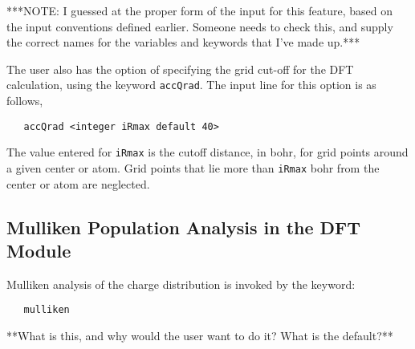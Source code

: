 \Large
***NOTE: I guessed at the proper form of the input for this feature, based
on the input conventions defined earlier.  Someone needs to check this,
and supply the correct names for the variables and keywords that I've made
up.***
\normalsize


The user also has the option of specifying the grid cut-off for the
DFT calculation, using the keyword \verb+accQrad+.  The input line for
this option is as follows,

\begin{verbatim}
   accQrad <integer iRmax default 40>
\end{verbatim}

The value entered for \verb+iRmax+ is the cutoff distance, in bohr, for grid
points around a given center or atom.  Grid points that lie more than 
\verb+iRmax+ bohr from the center or atom are neglected. 

\subsection{Mulliken Population Analysis in the DFT Module}

Mulliken analysis of the charge distribution is invoked by the keyword:
\begin{verbatim}
   mulliken
\end{verbatim}

\Large
**What is this, and why would the user want to do it?  What is the default?**
\normalsize


